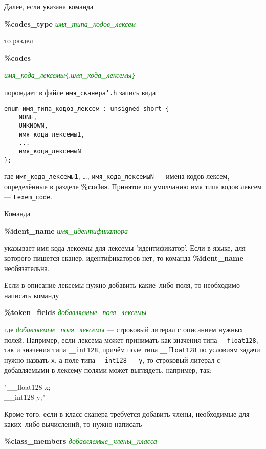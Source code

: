 \documentclass[10pt]{report}
\begin{document}
Далее, если указана команда

{\noindent%
\textbf{\%codes_type} \textcolor{Green}{\textit{имя_типа_кодов_лексем}}
}

\noindent то раздел

{\noindent%
\textbf{\%codes}

\textcolor{Green}{\textit{имя_кода_лексемы}}\texttt{\textcolor{Green}{\{}},\textcolor{Green}{\textit{имя_кода_лексемы}}\texttt{\textcolor{Green}{\}}}
}

\noindent%
порождает в файле \texttt{имя_сканера'.h} запись вида 
\begin{verbatim}
enum имя_типа_кодов_лексем : unsigned short {
    NONE,
    UNKNOWN,
    имя_кода_лексемы1,
    ...
    имя_кода_лексемыN
};
\end{verbatim}
где \texttt{имя_кода_лексемы1}, \dots, \texttt{имя_кода_лексемыN} ---  имена кодов лексем, определённые в разделе \textbf{\%codes}.  Принятое по умолчанию имя типа кодов лексем --- \texttt{Lexem_code}.

Команда

\noindent%
\textbf{\%ident_name} \textcolor{Green}{\textit{имя_идентификатора}}

\noindent указывает имя кода лексемы для лексемы 'идентификатор'. Если в языке, для которого пишется сканер, идентификаторов нет, то команда \textbf{\%ident_name} необязательна.

Если в описание лексемы нужно добавить какие--либо поля, то необходимо написать команду

\noindent%
\textbf{\%token_fields} \textcolor{Green}{\textit{добавляемые_поля_лексемы}}

\noindent где \textcolor{Green}{\textit{добавляемые_поля_лексемы}} --- строковый литерал с описанием нужных полей. Например, если лексема может принимать как значения типа
\texttt{__float128}, так и значения типа \texttt{__int128}, причём поле типа \texttt{__float128} по условиям задачи нужно назвать \texttt{x}, а поле типа  \texttt{__int128} ---
\texttt{y}, то строковый литерал с добавляемыми в лексему полями может выглядеть, например, так:

\noindent%
"__float128 x;\\
__int128    y;"

Кроме того, если в класс сканера требуется добавить члены, необходимые для каких--либо вычислений, то нужно написать

\noindent%
\textbf{\%class_members} \textcolor{Green}{\textit{добавляемые_члены_класса}}
\end{document}
